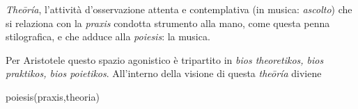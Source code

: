 \documentclass{gs}
\begin{document}
\emph{Theōría}, l'attività d'osservazione attenta e contemplativa (in musica: \emph{ascolto}) che si relaziona con la \emph{praxis} condotta strumento alla mano, come questa penna stilografica, e che adduce alla \emph{poiesis}: la musica.

Per Aristotele questo spazio agonistico è tripartito in \emph{bios theoretikos, bios praktikos, bios poietikos}. All'interno della visione di questa \emph{theōría} diviene

poiesis(praxis,theoria)


%
%
%
%
%
%
%
%

\printbibliography
\end{document}
